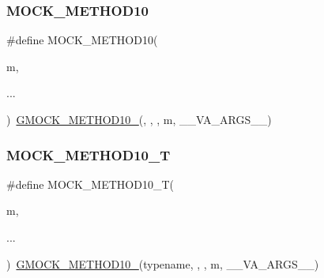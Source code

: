\mbox{\label{googletest-master_2googlemock_2include_2gmock_2gmock-generated-function-mockers_8h_a01760fdd295f5a92264eed6a9ff1dbf8}} 
\subsubsection{\texorpdfstring{MOCK\_METHOD10}{MOCK\_METHOD10}}
{\footnotesize\ttfamily \#define M\+O\+C\+K\+\_\+\+M\+E\+T\+H\+O\+D10(\begin{DoxyParamCaption}\item[{}]{m,  }\item[{}]{... }\end{DoxyParamCaption})~\mbox{\hyperlink{_obj__test_2lib_2googletest-release-1_88_81_2googlemock_2include_2gmock_2gmock-generated-function-mockers_8h_a81a48223a8771de36ef92ac6d56f6e81}{G\+M\+O\+C\+K\+\_\+\+M\+E\+T\+H\+O\+D10\+\_\+}}(, , , m, \+\_\+\+\_\+\+V\+A\+\_\+\+A\+R\+G\+S\+\_\+\+\_\+)}

\mbox{\label{googletest-master_2googlemock_2include_2gmock_2gmock-generated-function-mockers_8h_aa28723ba52933b5ea9a4ffa1a73d15e1}} 
\subsubsection{\texorpdfstring{MOCK\_METHOD10\_T}{MOCK\_METHOD10\_T}}
{\footnotesize\ttfamily \#define M\+O\+C\+K\+\_\+\+M\+E\+T\+H\+O\+D10\+\_\+T(\begin{DoxyParamCaption}\item[{}]{m,  }\item[{}]{... }\end{DoxyParamCaption})~\mbox{\hyperlink{_obj__test_2lib_2googletest-release-1_88_81_2googlemock_2include_2gmock_2gmock-generated-function-mockers_8h_a81a48223a8771de36ef92ac6d56f6e81}{G\+M\+O\+C\+K\+\_\+\+M\+E\+T\+H\+O\+D10\+\_\+}}(typename, , , m, \+\_\+\+\_\+\+V\+A\+\_\+\+A\+R\+G\+S\+\_\+\+\_\+)}

